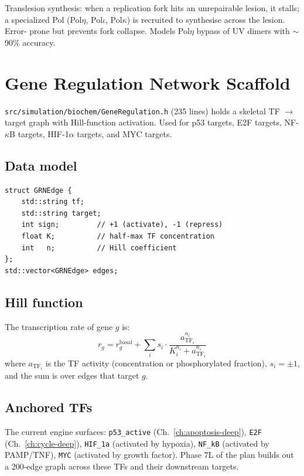 \documentclass[11pt,letterpaper,twoside,openany]{book}
\newcommand{\code}[1]{\texttt{#1}}
\newcommand{\file}[1]{\texttt{\small#1}}
\begin{document}
Translesion synthesis: when a replication fork hits an unrepairable
lesion, it stalls; a specialized Pol (Pol$\eta$, Pol$\iota$,
Pol$\kappa$) is recruited to synthesise across the lesion. Error-
prone but prevents fork collapse. Models Pol$\eta$ bypass of UV
dimers with $\sim$90\% accuracy.

\chapter{Gene Regulation Network Scaffold}
\label{ch:grn}

\file{src/simulation/biochem/GeneRegulation.h} (235 lines) holds a
skeletal TF $\to$ target graph with Hill-function activation. Used
for p53 targets, E2F targets, NF-$\kappa$B targets, HIF-1$\alpha$
targets, and MYC targets.

\section{Data model}

\begin{lstlisting}
struct GRNEdge {
    std::string tf;
    std::string target;
    int sign;         // +1 (activate), -1 (repress)
    float K;          // half-max TF concentration
    int   n;          // Hill coefficient
};
std::vector<GRNEdge> edges;
\end{lstlisting}

\section{Hill function}

The transcription rate of gene $g$ is:
\begin{equation}
  r_g = r_g^{\text{basal}} + \sum_i s_i \cdot \frac{a_{\text{TF}_i}^{n_i}}{K_i^{n_i} + a_{\text{TF}_i}^{n_i}}
\end{equation}
where $a_{\text{TF}_i}$ is the TF activity (concentration or
phosphorylated fraction), $s_i = \pm 1$, and the sum is over edges
that target $g$.

\section{Anchored TFs}

The current engine surfaces: \code{p53\_active} (Ch.~\ref{ch:apoptosis-deep}),
\code{E2F} (Ch.~\ref{ch:cycle-deep}), \code{HIF\_1a}
(activated by hypoxia), \code{NF\_kB} (activated by PAMP/TNF),
\code{MYC} (activated by growth factor). Phase 7L of the plan
builds out a 200-edge graph across these TFs and their downstream
targets.
\end{document}
